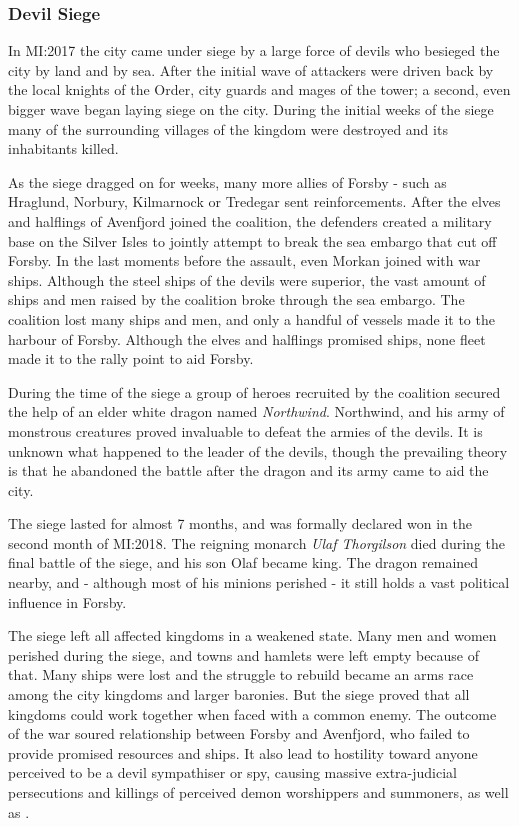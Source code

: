 \subsubsection{Devil Siege}
\label{sec:Devil Siege}


In MI:2017 the city came under siege by a large force of devils who besieged
the city by land and by sea. After the initial wave of attackers were driven
back by the local knights of the Order, city guards and mages of the tower; a
second, even bigger wave began laying siege on the city. During the initial
weeks of the siege many of the surrounding villages of the kingdom were
destroyed and its inhabitants killed.

As the siege dragged on for weeks, many more allies of Forsby - such as
Hraglund, Norbury, Kilmarnock or Tredegar sent reinforcements. After the elves
and halflings of Avenfjord joined the coalition, the defenders created a
military base on the Silver Isles to jointly attempt to break the sea embargo
that cut off Forsby. In the last moments before the assault, even Morkan
joined with war ships. Although the steel ships of the devils were superior,
the vast amount of ships and men raised by the coalition broke through the sea
embargo. The coalition lost many ships and men, and only a handful of vessels
made it to the harbour of Forsby. Although the elves and halflings promised
ships, none fleet made it to the rally point to aid Forsby.

During the time of the siege a group of heroes recruited by the coalition
secured the help of an elder white dragon named \emph{Northwind}. Northwind,
and his army of monstrous creatures proved invaluable to defeat the armies of
the devils. It is unknown what happened to the leader of the devils, though
the prevailing theory is that he abandoned the battle after the dragon and its
army came to aid the city.

The siege lasted for almost 7 months, and was formally declared won in the
second month of MI:2018. The reigning monarch \emph{Ulaf Thorgilson} died
during the final battle of the siege, and his son Olaf became king. The dragon
remained nearby, and - although most of his minions perished - it still holds
a vast political influence in Forsby.

The siege left all affected kingdoms in a weakened state. Many men and women
perished during the siege, and towns and hamlets were left empty because of
that. Many ships were lost and the struggle to rebuild became an arms race
among the city kingdoms and larger baronies. But the siege proved that all
kingdoms could work together when faced with a common enemy. The outcome of
the war soured relationship between Forsby and Avenfjord, who failed to
provide promised resources and ships. It also lead to hostility toward anyone
perceived to be a devil sympathiser or spy, causing massive extra-judicial
persecutions and killings of perceived demon worshippers and summoners, as
well as .

